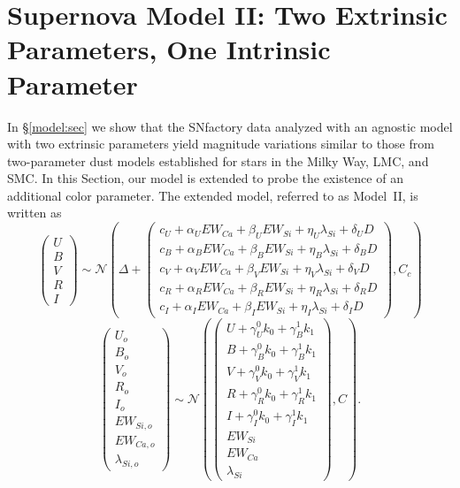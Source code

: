 \documentclass{aastex61}   	%
\begin{document}
\section{Supernova Model II: Two Extrinsic Parameters, One Intrinsic Parameter}
\label{model2:sec}
In \S\ref{model:sec} we show that the SNfactory data analyzed with an agnostic model with
two extrinsic parameters yield magnitude variations
similar
to those from  two-parameter dust models established for stars in the Milky Way, LMC, and SMC.
In this Section, our model is extended
to probe the existence of
an additional
color parameter.
The extended model, referred to as Model~II, is written as
\begin{equation}
\begin{pmatrix}
U\\B\\V\\R\\I
\end{pmatrix}
\sim \mathcal{N}
\left(
\Delta +
\begin{pmatrix}
c_U+\alpha_U EW_{Ca} + \beta_U EW_{Si} + \eta_U \lambda_{Si} + \delta_U D\\
c_B+\alpha_B EW_{Ca} + \beta_B EW_{Si} + \eta_B \lambda_{Si} + \delta_B D \\
c_V+\alpha_V EW_{Ca} + \beta_V EW_{Si} + \eta_V \lambda_{Si} + \delta_V D\\
c_R+\alpha_R EW_{Ca} + \beta_R EW_{Si} + \eta_R \lambda_{Si} + \delta_R D\\
c_I+\alpha_I EW_{Ca} + \beta_I EW_{Si}+ \eta_I \lambda_{Si} + \delta_I D
\end{pmatrix}
,C_{c}
\right)
\label{ewsiv2:eqn}
\end{equation}
\begin{equation}
\begin{pmatrix}
U_o\\B_o\\ V_o\\R_o\\I_o\\EW_{Si, o}\\ EW_{Ca, o} \\ \lambda_{Si, o}
\end{pmatrix}
\sim \mathcal{N}
\left(
\begin{pmatrix}
U +\gamma^0_{U} k_0 +\gamma^1_{B} k_1 \\B +\gamma^0_{B} k_0 +\gamma^1_{B} k_1 \\
V+\gamma^0_{V} k_0+\gamma^1_{V} k_1\\R+\gamma^0_{R} k_0 + \gamma^1_{R} k_1\\I+\gamma^0_{I} k_0+\gamma^1_{I} k_1\\
EW_{Si}\\ EW_{Ca} \\ \lambda_{Si}
\end{pmatrix}
,C
\right).
\label{dust2:eqn}
\end{equation}
\end{document}
